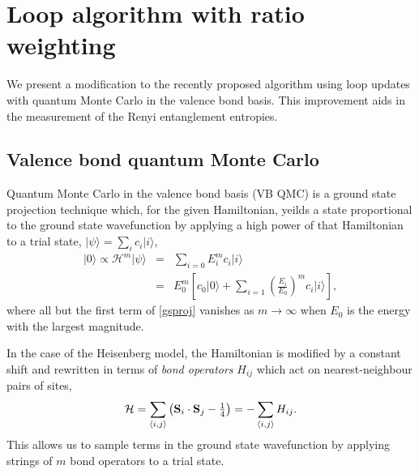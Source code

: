 \documentclass[prb,aps,twocolumn,floatfix,amsmath,amssymb,superscriptaddress,tightenlines]{revtex4}
\begin{document}
\section{Loop algorithm with ratio weighting}

We present a modification to the recently proposed algorithm using loop updates with quantum Monte Carlo in the valence bond basis.  This improvement aids in the measurement of the Renyi entanglement entropies.


\subsection{Valence bond quantum Monte Carlo}

Quantum Monte Carlo in the valence bond basis (VB QMC) is a ground state projection technique which, for the given Hamiltonian, yeilds a state proportional to the ground state wavefunction by applying a high power of that Hamiltonian to a  trial state, $\lvert \psi \rangle = \sum_i c_i \lvert i \rangle$,
\begin{eqnarray}
	\lvert 0 \rangle \propto \mathcal{H}^m \lvert \psi \rangle &=& \sum_{i=0} E_i^m c_i\lvert i \rangle  \\
	&=& E_0^m \left[ c_0 \lvert 0 \rangle + \sum_{i=1} \left(\frac{E_i}{E_0}\right) ^m c_i\lvert i \rangle \right] \label{gsproj},
\end{eqnarray}
where all but the first term of \eqref{gsproj} vanishes as $m \rightarrow \infty$ when $E_0$ is the energy with the largest magnitude.

In the case of the Heisenberg model, the Hamiltonian is modified by a constant shift and rewritten in terms of {\it bond operators} $H_{ij}$ which act on nearest-neighbour pairs of sites,
\begin{equation}
	 \mathcal{H} = \sum_{\langle i,j \rangle} \left({\bf S}_i \cdot {\bf S}_j - \tfrac{1}{4}\right) =  -\sum_{\langle i,j \rangle} H_{ij}.
\end{equation}
This allows us to sample terms in the ground state wavefunction by applying strings of $m$ bond operators to a trial state.
\end{document}
